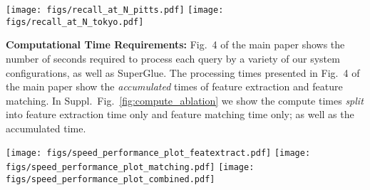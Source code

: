 \begin{figure*}[t!]
    \centering
    \texttt{[image: figs/recall\_at\_N\_pitts.pdf]}
    \hfil
    \texttt{[image: figs/recall\_at\_N\_tokyo.pdf]}
    \caption{\textbf{Comparison with state-of-the-art.} We show the Recall$@N$ performance of Ours (Multi-RANSAC-Patch-NetVLAD) compared to AP-GEM~\cite{revaud2019learning}, DenseVLAD~\cite{Torii2018}, NetVLAD~\cite{AR2018} and SuperGlue~\cite{sarlin20superglue}, on the Pittsburgh (left) and Tokyo 24/7 (right) datasets.}
    \label{fig:recalltokyopitts}
\end{figure*}


\textbf{Computational Time Requirements:}
Fig.~4 of the main paper shows the number of seconds required to process each query by a variety of our system configurations, as well as SuperGlue. The processing times presented in Fig.~4 of the main paper show the \textit{accumulated} times of feature extraction and feature matching. In Suppl.~Fig.~\ref{fig:compute_ablation} we show the compute times \textit{split} into feature extraction time only and feature matching time only; as well as the accumulated time.

\begin{figure*}[t!]
    \centering
    \texttt{[image: figs/speed\_performance\_plot\_featextract.pdf]}\hfill
    \texttt{[image: figs/speed\_performance\_plot\_matching.pdf]}\hfill
    \texttt{[image: figs/speed\_performance\_plot\_combined.pdf]}\hfill
    \\
    \makebox[0.012\textwidth][c]{}
    \hfill
    \hfill
    \hfill
    \makebox[0.315\textwidth][c]{}\\[0.2cm]
    \caption{\textbf{Computational time requirements.} The number of seconds required to process each query are shown on the $x$-axis, with the resulting R@1 shown on the $y$-axis, for the Mapillary dataset. (a) indicates the times taken for feature extraction only, while (b) shows the feature matching time. In (c) we show the combined time (as in Fig~4 in the main paper). Triangles indicate single-scale Patch-NetVLAD, while stars indicate multi-scale Patch-NetVLAD. Filled symbols are used for RANSAC matching, while hollow symbols are used for the rapid spatial verification. The color indicates varying PCA dimensions.
    }
    \label{fig:compute_ablation}
\end{figure*}

